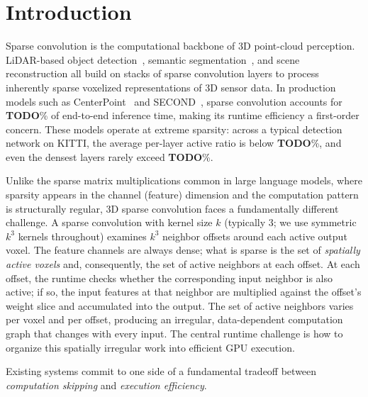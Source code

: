 \section{Introduction}
\label{sec:intro}

Sparse convolution is the computational backbone of 3D point-cloud
perception.
LiDAR-based object detection~\cite{centerpoint,second}, semantic
segmentation~\cite{semantickitti}, and scene reconstruction all build on
stacks of sparse convolution layers to process inherently sparse voxelized
representations of 3D sensor data.
In production models such as CenterPoint~\cite{centerpoint} and
SECOND~\cite{second}, sparse convolution accounts for
\textbf{TODO}\% of end-to-end inference time, making its runtime
efficiency a first-order concern.
These models operate at extreme sparsity: across a typical detection
network on KITTI, the average per-layer active ratio is below
\textbf{TODO}\%, and even the densest layers rarely exceed
\textbf{TODO}\%.

Unlike the sparse matrix multiplications common in large language models,
where sparsity appears in the channel (feature) dimension and the
computation pattern is structurally regular, 3D sparse convolution faces a
fundamentally different challenge.
A sparse convolution with kernel size $k$ (typically 3; we use symmetric
$k^3$ kernels throughout) examines $k^3$ neighbor offsets around each
active output voxel.
The feature channels are always dense; what is sparse is the set of
\emph{spatially active voxels} and, consequently, the set of active
neighbors at each offset.
At each offset, the runtime checks whether the corresponding input
neighbor is also active; if so, the input features at that neighbor are
multiplied against the offset's weight slice and accumulated into the
output.
The set of active neighbors varies per voxel and per offset, producing an
irregular, data-dependent computation graph that changes with every input.
The central runtime challenge is how to organize this spatially irregular
work into efficient GPU execution.

Existing systems commit to one side of a fundamental tradeoff between
\emph{computation skipping} and \emph{execution efficiency}.

